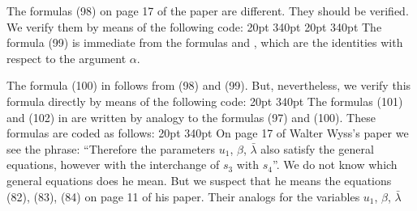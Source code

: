 \medskip
\noindent
The formulas (98) on page 17 of the paper  are different. They should be 
verified. We verify them by means of the following code:
\medskip
{} 20pt 340pt
\noindent
{}
\medskip
{} 20pt 340pt
\noindent
{}
\medskip
\noindent
The formula (99) is immediate from the formulas  and ,
which are the identities with respect to the argument $\alpha$.\par
     The formula (100) in  follows from (98) and (99). But, nevertheless,
we verify this formula directly by means of the following code:
\medskip
{} 20pt 340pt
\noindent
{}
\medskip
\noindent
The formulas (101) and (102) in  are written by analogy to the formulas
(97) and (100). These formulas are coded as follows:
\medskip
{} 20pt 340pt
\noindent
{}
\medskip
\noindent
On page 17 of Walter Wyss's paper  we see the phrase: ``Therefore the 
parameters $u_1$, $\beta$, $\bar\lambda$ also satisfy the general equations, 
however with the interchange of $s_3$ with $s_4$''. We do not know which general
equations does he mean. But we suspect that he means the equations (82), (83), (84)
on page 11 of his paper. Their analogs for the variables $u_1$, $\beta$, $\bar\lambda$ 
